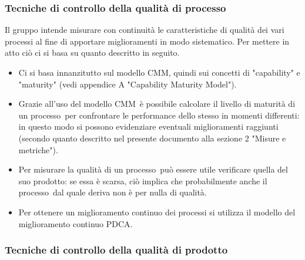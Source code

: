 \documentclass[../PianoDiQualifica.tex]{subfiles}
\begin{document}
			\subsubsection{Tecniche di controllo della qualità di processo}
			Il gruppo intende misurare con continuità le caratteristiche di qualità dei vari processi al fine di apportare miglioramenti in modo sistematico. Per mettere in atto ciò ci si basa su quanto descritto in seguito.
			\begin{itemize}
				\item Ci si basa innanzitutto sul modello CMM\g, quindi sui concetti di "capability" e "maturity" (vedi appendice A "Capability Maturity Model").
				\item Grazie all'uso del modello CMM\g\ è possibile calcolare il livello di maturità di un processo\g\ per confrontare le performance dello stesso in momenti differenti: in questo modo si possono evidenziare eventuali miglioramenti raggiunti (secondo quanto descritto nel presente documento alla sezione 2 "Misure e metriche").
				\item Per misurare la qualità di un processo\g\ può essere utile verificare quella del suo prodotto\g: se essa è scarsa, ciò implica che probabilmente anche il processo\g\ 
dal quale deriva non è per nulla di qualità.
				\item Per ottenere un miglioramento continuo dei processi si utilizza il modello del miglioramento continuo PDCA\g.
			\end{itemize}
			\subsubsection{Tecniche di controllo della qualità di prodotto}
\end{document}
